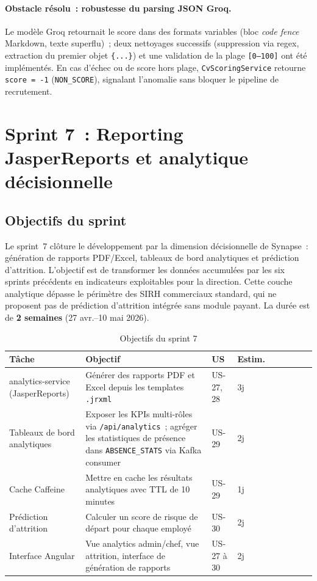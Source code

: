 \paragraph{Obstacle résolu~: robustesse du parsing JSON Groq.}
Le modèle Groq retournait le score dans des formats variables (bloc \textit{code fence} Markdown, texte superflu)~; deux nettoyages successifs (suppression via regex, extraction du premier objet \texttt{\{...\}}) et une validation de la plage \texttt{[0--100]} ont été implémentés. En cas d'échec ou de score hors plage, \texttt{CvScoringService} retourne \texttt{score = -1} (\texttt{NON\_SCORE}), signalant l'anomalie sans bloquer le pipeline de recrutement.

\section{Sprint 7~: Reporting JasperReports et analytique décisionnelle}

\subsection{Objectifs du sprint}

Le sprint~7 clôture le développement par la dimension décisionnelle de Synapse~:
génération de rapports PDF/Excel, tableaux de bord analytiques et prédiction
d’attrition. L’objectif est de transformer les données accumulées par les six
sprints précédents en indicateurs exploitables pour la direction. Cette couche analytique dépasse le périmètre des SIRH commerciaux standard,
qui ne proposent pas de prédiction d’attrition intégrée sans module payant. La durée est de
\textbf{2 semaines} (27 avr.--10 mai 2026).

\begin{table}[H]
\centering
\caption{Objectifs du sprint 7}
\label{tab:sprint7_obj}
\begin{tabularx}{\textwidth}{VlVLVlVlV}
\hline
\textbf{Tâche} & \textbf{Objectif} & \textbf{US} & \textbf{Estim.} \\
\hline
analytics-service (JasperReports) & Générer des rapports PDF et Excel depuis les templates \texttt{.jrxml} & US-27, 28 & 3j \\
\hline
Tableaux de bord analytiques & Exposer les KPIs multi-rôles via \texttt{/api/analytics}~; agréger les statistiques de présence dans \texttt{ABSENCE\_STATS} via Kafka consumer & US-29 & 2j \\
\hline
Cache Caffeine & Mettre en cache les résultats analytiques avec TTL de 10 minutes & US-29 & 1j \\
\hline
Prédiction d’attrition & Calculer un score de risque de départ pour chaque employé & US-30 & 2j \\
\hline
Interface Angular & Vue analytics admin/chef, vue attrition, interface de génération de rapports & US-27 à 30 & 2j \\
\hline
\end{tabularx}
\end{table}


